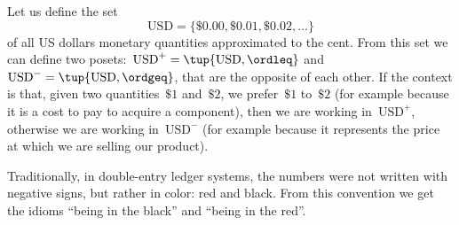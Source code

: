 \begin{example}
    Let us define the set
    \begin{equation*}
        \text{USD}=\{\$0.00,\$0.01,\$0.02,\dots\}
    \end{equation*}
    of all US dollars monetary quantities approximated to the cent.
    From this set we can define two posets:~$\text{USD}^{+} = \tup{\text{USD}, \ordleq}$ and~$\text{USD}^{-} = \tup{\text{USD}, \ordgeq}$, that are the opposite of each other.
    If the context is that, given two quantities~$\$1$ and~$\$2$, we prefer~$\$1$ to~$\$2$ (for example because it is a cost to pay to acquire a component), then we are working in~$\text{USD}^{+}$,
    otherwise we are working in~$\text{USD}^{-}$ (for example because it represents the price at which we are selling our product).

    Traditionally, in double-entry ledger systems, the numbers were not written with negative signs, but rather in color: red and black. From this convention we get the idioms ``being in the black'' and ``being in the red''.
\end{example}






